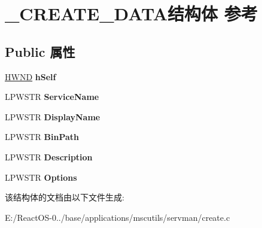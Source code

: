 \hypertarget{struct___c_r_e_a_t_e___d_a_t_a}{}\section{\+\_\+\+C\+R\+E\+A\+T\+E\+\_\+\+D\+A\+T\+A结构体 参考}
\label{struct___c_r_e_a_t_e___d_a_t_a}
\subsection*{Public 属性}
\begin{DoxyCompactItemize}
\item 
\mbox{\label{struct___c_r_e_a_t_e___d_a_t_a_a35f88fa261713b8817cdb2f001226f7d}} 
\hyperlink{interfacevoid}{H\+W\+ND} {\bfseries h\+Self}
\item 
\mbox{\label{struct___c_r_e_a_t_e___d_a_t_a_a7b678a931f815e31e8049d180e7decb1}} 
L\+P\+W\+S\+TR {\bfseries Service\+Name}
\item 
\mbox{\label{struct___c_r_e_a_t_e___d_a_t_a_a5db477f97fdfe62bf1d6d376bf666c3e}} 
L\+P\+W\+S\+TR {\bfseries Display\+Name}
\item 
\mbox{\label{struct___c_r_e_a_t_e___d_a_t_a_a0e894d8499ac6cffb1a5038c461dc7c3}} 
L\+P\+W\+S\+TR {\bfseries Bin\+Path}
\item 
\mbox{\label{struct___c_r_e_a_t_e___d_a_t_a_a33fee8d145cb1febafd99cb9bd02a96b}} 
L\+P\+W\+S\+TR {\bfseries Description}
\item 
\mbox{\label{struct___c_r_e_a_t_e___d_a_t_a_a26fac974062c4a665b3dc96b364f55d5}} 
L\+P\+W\+S\+TR {\bfseries Options}
\end{DoxyCompactItemize}


该结构体的文档由以下文件生成\+:\begin{DoxyCompactItemize}
\item 
E\+:/\+React\+O\+S-\/0../base/applications/mscutils/servman/create.\+c\end{DoxyCompactItemize}
